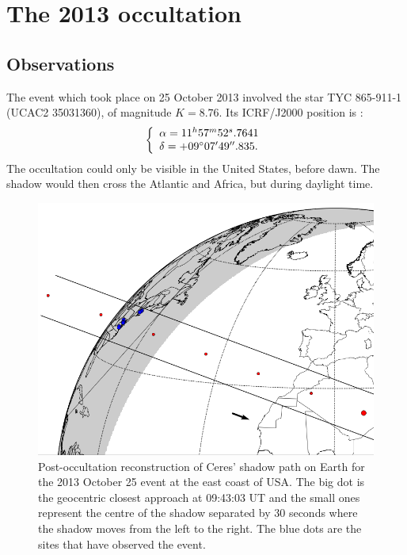 \documentclass[useAMS,usenatbib]{mn2e}
\begin{document}
\section[]{The 2013 occultation}

\subsection{Observations}\label{Sec: observation-2013}

The event which took place on 25 October 2013 involved the star TYC 865-911-1 (UCAC2 35031360), of magnitude $K = 8.76$. Its ICRF/J2000 position is \citep{Zacharias2004}:
%
\begin{equation}
\left\{ 
  \begin{array}{l l}
    \alpha = 11^{h}57^{m}52^{s}.7641\\
    \delta = +09\hbox{$^\circ$} 07\hbox{$^\prime$} 49\hbox{$^{\prime\prime}$}.835.
  \end{array}
\right.
\end{equation}
%
The occultation could only be visible in the United States, before dawn. The shadow would then cross the Atlantic and Africa, but during daylight time.

\begin{figure}
\includegraphics[scale=0.42]{figures/Ceres_2013.png} 
\caption{Post-occultation reconstruction of Ceres' shadow path on Earth for the 2013 October 25 event at the east coast of USA. The big dot is the geocentric closest approach at 09:43:03 UT and the small ones represent the centre of the shadow separated by 30 seconds where the shadow moves from the left to the right. The blue dots are the sites that have observed the event.\label{Fig: Ceres-2013-map}}
\end{figure}
\end{document}
